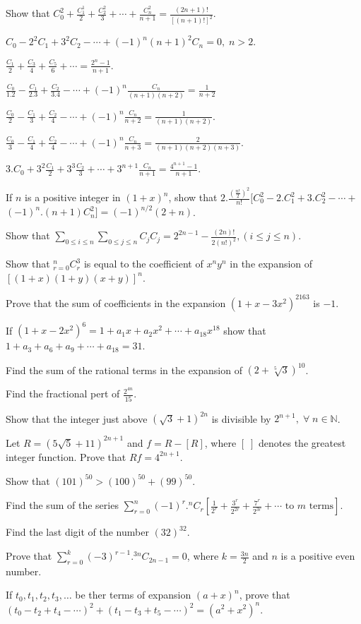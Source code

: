 \item Show that $C_0^2 + \frac{C_1^1}{2} + \frac{C_2^2}{3} + \cdots + \frac{C_n^2}{n + 1} = \frac{(2n + 1)!}{[(n + 1)!]^2}$.
\item $C_0 - 2^2C_1 + 3^2C_2 - \cdots + (-1)^n(n + 1)^2C_n = 0,\;n>2$.
\item $\frac{C_1}{2} + \frac{C_3}{4} + \frac{C_5}{6} + \cdots = \frac{2^n - 1}{n + 1}$.
\item $\frac{C_0}{1.2} - \frac{C_1}{2.3} + \frac{C_2}{3.4} - \cdots + (-1)^n\frac{C_n}{(n + 1)(n + 2)} = \frac{1}{n + 2}$
\item $\frac{C_0}{2} - \frac{C_1}{3} + \frac{C_2}{4} - \cdots + (-1)^n\frac{C_n}{n + 2} = \frac{1}{(n + 1)(n + 2)}$.
\item $\frac{C_0}{3} - \frac{C_1}{4} + \frac{C_2}{4} - \cdots + (-1)^n\frac{C_n}{n + 3} = \frac{2}{(n + 1)(n + 2)(n + 3)}$.
\item $3.C_0 + 3^2\frac{C_1}{2} + 3^3\frac{C_2}{3} + \cdots + 3^{n + 1}\frac{C_n}{n+ 1} = \frac{4^{n + 1} - 1}{n + 1}$.
\item If $n$ is a positive integer in $(1 + x)^n$, show that $2.\frac{\left(\frac{n!}{2}\right)^2}{n!}[C_0^2 - 2.C_1^2 +
  3.C_2^2 - \cdots + $ $(-1)^n.(n + 1)C_n^2] = (-1)^{n/2}(2 + n)$.
\item Show that $\displaystyle\sum_{0\leq i\leq n}\sum_{0\leq j\leq n}C_jC_j = 2^{2n - 1} - \frac{(2n)!}{2(n!)^2}, (i\leq j\leq
  n)$.
\item Show that $\displaystyle_{r=0}^nC_r^3$ is equal to the coefficient of $x^ny^n$ in the expansion of $[(1 + x)(1 + y)(x +
  y)]^n$.
\item Prove that the sum of coefficients in the expansion $(1 + x -3x^2)^{2163}$ is $-1$.
\item If $(1 + x - 2x^2)^6 = 1 + a_1x + a_2x^2 + \cdots + a_{18}x^{18}$ show that $1 + a_3 + a_6 + a_9 +
  \cdots + a_{18} = 31$.
\item Find the sum of the rational terms in the expansion of $(2 + \sqrt[5]{3})^{10}$.
\item Find the fractional pert of $\frac{2^{4n}}{15}$.
\item Show that the integer just above $(\sqrt{3} + 1)^{2n}$ is divisible by $2^{n + 1},\;\forall\;n\in\mathbb{N}$.
\item Let $R = (5\sqrt{5} + 11)^{2n + 1}$ and $f = R - [R]$, where $[\;]$ denotes the greatest integer function. Prove that $Rf =
  4^{2n + 1}$.
\item Show that $(101)^{50} > (100)^{50} + (99)^{50}$.
\item Find the sum of the series $\displaystyle\sum_{r=0}^n(-1)^r.{}^nC_r\left[\frac{1}{2^r} + \frac{3^r}{2^{2r}} +
  \frac{7^r}{2^{3r}} + \cdots \text{~to~}m\text{~terms}\right]$.
\item Find the last digit of the number $(32)^{32}$.
\item Prove that $\displaystyle\sum_{r=0}^k(-3)^{r - 1}.{}^{3n}C_{2n- 1} = 0$, where $k = \frac{3n}{2}$ and $n$ is a positive even
  number.
\item If $t_0, t_1, t_2, t_3, \ldots$ be ther terms of expansion $(a + x)^n$, prove that $(t_0 - t_2 + t_4 - \cdots)^2 + (t_1 - t_3
  + t_5 - \cdots)^2 = (a^2 + x^2)^n$.
\stopitemize

